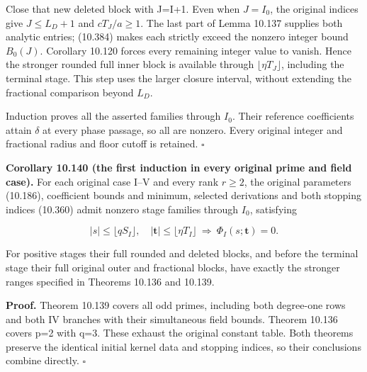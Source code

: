 \documentclass[
  11pt,
  a4paper,
]{article}
\begin{document}
Close that new deleted block with J=I+1. Even when \(J=I_0\), the
original indices give \(J\le L_D+1\) and \(cT_J/a\ge1\). The last part
of Lemma 10.137 supplies both analytic entries; (10.384) makes each
strictly exceed the nonzero integer bound \(B_0(J)\). Corollary 10.120
forces every remaining integer value to vanish. Hence the stronger
rounded full inner block is available through
\(\lfloor\eta T_J\rfloor\), including the terminal stage. This step uses
the larger closure interval, without extending the fractional comparison
beyond \(L_D\).

Induction proves all the asserted families through \(I_0\). Their
reference coefficients attain \(\delta\) at every phase passage, so all
are nonzero. Every original integer and fractional radius and floor
cutoff is retained. \(\square\)

\textbf{Corollary 10.140 (the first induction in every original prime
and field case).} For each original case I--V and every rank \(r\ge2\),
the original parameters (10.186), coefficient bounds and minimum,
selected derivations and both stopping indices (10.360) admit nonzero
stage families through \(I_0\), satisfying

\[
|s|\le\lfloor qS_I\rfloor,\quad
|\boldsymbol t|\le\lfloor\eta T_I\rfloor
\ \Longrightarrow\ \Phi_I(s;\boldsymbol t)=0.
\tag{10.392}
\]

For positive stages their full rounded and deleted blocks, and before
the terminal stage their full original outer and fractional blocks, have
exactly the stronger ranges specified in Theorems 10.136 and 10.139.

\textbf{Proof.} Theorem 10.139 covers all odd primes, including both
degree-one rows and both IV branches with their simultaneous field
bounds. Theorem 10.136 covers p=2 with q=3. These exhaust the original
constant table. Both theorems preserve the identical initial kernel data
and stopping indices, so their conclusions combine directly. \(\square\)
\end{document}
